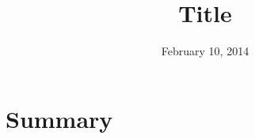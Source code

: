 \documentclass[a4paper,10pt]{article}
\title{Title}
\date{February 10, 2014}
\begin{document}
\maketitle

\section{Summary}

\begin{keywords}
\end{keywords}                                       %
\newpage
\tableofcontents                                                  
\newpage

\end{document}
